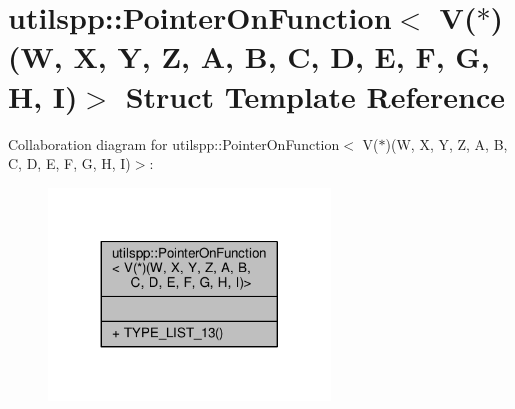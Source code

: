 \hypertarget{structutilspp_1_1PointerOnFunction_3_01V_07_5_08_07W_00_01X_00_01Y_00_01Z_00_01A_00_01B_00_01C_028efef8fb2e99a7c8e542e8efa07b21c}{\section{utilspp\-:\-:Pointer\-On\-Function$<$ V($\ast$)(W, X, Y, Z, A, B, C, D, E, F, G, H, I)$>$ Struct Template Reference}
\label{structutilspp_1_1PointerOnFunction_3_01V_07_5_08_07W_00_01X_00_01Y_00_01Z_00_01A_00_01B_00_01C_028efef8fb2e99a7c8e542e8efa07b21c}
}


Collaboration diagram for utilspp\-:\-:Pointer\-On\-Function$<$ V($\ast$)(W, X, Y, Z, A, B, C, D, E, F, G, H, I)$>$\-:\nopagebreak
\begin{figure}[H]
\begin{center}
\leavevmode
\includegraphics[width=212pt]{structutilspp_1_1PointerOnFunction_3_01V_07_5_08_07W_00_01X_00_01Y_00_01Z_00_01A_00_01B_00_01C_0cbfda582eb3c7116e6ce09df604ef645}
\end{center}
\end{figure}
